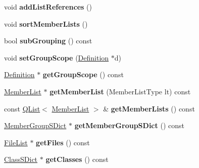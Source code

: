 \begin{DoxyCompactItemize}
\mbox{\label{class_group_def_acef94f92bb7f07b5c8dc03bcfdd7f5b0}} 
void {\bfseries add\+List\+References} ()
\item 
\mbox{\label{class_group_def_af29c5742610869db222c9b093c7fecfd}} 
void {\bfseries sort\+Member\+Lists} ()
\item 
\mbox{\label{class_group_def_aae42bfde1fb3fa9155a9b28911dd2a18}} 
bool {\bfseries sub\+Grouping} () const
\item 
\mbox{\label{class_group_def_a1d2494fa72857a2328ee5787f03f61a7}} 
void {\bfseries set\+Group\+Scope} (\mbox{\hyperlink{class_definition}{Definition}} $\ast$d)
\item 
\mbox{\label{class_group_def_a160756d3e3de8da1a60bffe341372a51}} 
\mbox{\hyperlink{class_definition}{Definition}} $\ast$ {\bfseries get\+Group\+Scope} () const
\item 
\mbox{\label{class_group_def_a7ce5a66d4d731ad9190b59f8cbbe0849}} 
\mbox{\hyperlink{class_member_list}{Member\+List}} $\ast$ {\bfseries get\+Member\+List} (Member\+List\+Type lt) const
\item 
\mbox{\label{class_group_def_a3530a320e387ff8014ecda67af65ed4c}} 
const \mbox{\hyperlink{class_q_list}{Q\+List}}$<$ \mbox{\hyperlink{class_member_list}{Member\+List}} $>$ \& {\bfseries get\+Member\+Lists} () const
\item 
\mbox{\label{class_group_def_a371f2b1ece70b88050f5e380208c10c5}} 
\mbox{\hyperlink{class_member_group_s_dict}{Member\+Group\+S\+Dict}} $\ast$ {\bfseries get\+Member\+Group\+S\+Dict} () const
\item 
\mbox{\label{class_group_def_ae13d020d4270577a4b6514edee2490be}} 
\mbox{\hyperlink{class_file_list}{File\+List}} $\ast$ {\bfseries get\+Files} () const
\item 
\mbox{\label{class_group_def_a00a79b22e72c1c47b0d758ba76ed4a9e}} 
\mbox{\hyperlink{class_class_s_dict}{Class\+S\+Dict}} $\ast$ {\bfseries get\+Classes} () const
\item 

\end{DoxyCompactItemize}

